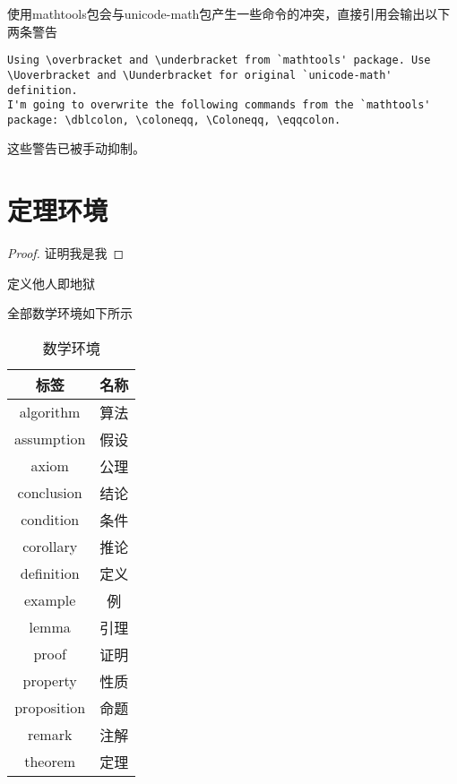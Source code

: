 使用mathtools包会与unicode-math包产生一些命令的冲突，直接引用会输出以下两条警告
\begin{lstlisting}
Using \overbracket and \underbracket from `mathtools' package. Use \Uoverbracket and \Uunderbracket for original `unicode-math' definition.
I'm going to overwrite the following commands from the `mathtools' package: \dblcolon, \coloneqq, \Coloneqq, \eqqcolon.
\end{lstlisting}
这些警告已被手动抑制。

\section{定理环境}

\begin{proof}
    证明我是我
\end{proof}

\begin{definition}[他人]
    定义他人即地狱
\end{definition}

全部数学环境如下所示

\begin{table}[htbp]
    \caption{数学环境}
    \label{tab:mathenv}
    \begin{tabular}{cc}
        \toprule
        标签 & 名称 \\
        \midrule
        algorithm & 算法 \\
        assumption & 假设 \\
        axiom & 公理 \\
        conclusion & 结论 \\
        condition & 条件 \\
        corollary & 推论 \\
        definition & 定义 \\
        example & 例 \\ 
        lemma & 引理 \\
        proof & 证明 \\
        property & 性质 \\
        proposition & 命题 \\
        remark & 注解 \\
        theorem & 定理 \\
        \bottomrule
    \end{tabular}
\end{table}

